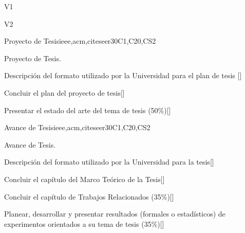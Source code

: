 \begin{syllabus}
\begin{competences}{V1}
\item {} 
\item {}
\item {}
\end{competences}

\begin{competences}{V2}
\item {} 
\item {}
\item {}
\end{competences}

\begin{unit}{Proyecto de Tesis}{}{ieee,acm,citeseer}{30}{C1,C20,CS2}
   \begin{topics}
      \item Proyecto de Tesis.
   \end{topics}
   \begin{learningoutcomes}
      \item Descripción del formato utilizado por la Universidad para el plan de tesis [\Assessment]
      \item Concluir el plan del proyecto de tesis[\Assessment]
      \item Presentar el estado del arte del tema de tesis (50\%)[\Assessment]
   \end{learningoutcomes}
\end{unit}

\begin{unit}{Avance de Tesis}{}{ieee,acm,citeseer}{30}{C1,C20,CS2}
   \begin{topics}
      \item Avance de Tesis.
   \end{topics}
   \begin{learningoutcomes}
      \item Descripción del formato utilizado por la Universidad para la tesis[\Assessment]
      \item Concluir el capítulo del Marco Teórico de la Tesis[\Assessment]
      \item Concluir el capítulo de Trabajos Relacionados (35\%)[\Assessment]
      \item Planear, desarrollar y presentar resultados (formales o estadísticos) de experimentos orientados a su tema de tesis (35\%)[\Assessment]
   \end{learningoutcomes}
\end{unit}

\begin{coursebibliography}
\end{coursebibliography}
\end{syllabus}
